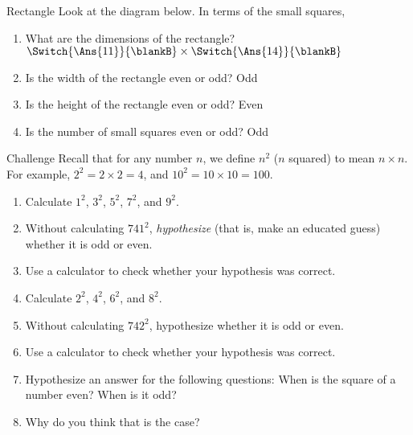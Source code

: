 \documentclass[12pt,letterpaper]{article}
\begin{document}
\begin{problem}{Rectangle}
 Look at the diagram below. In terms of the small squares,

 \begin{center}
 \end{center}

 \begin{enumerate}
  \item What are the dimensions of the rectangle? \hfill
  \(\Switch{\Ans{11}}{\blankB}\times\Switch{\Ans{14}}{\blankB}\)
  \item Is the width of the rectangle even or odd?
  \hfill Odd \hspace{1em} 
  \item Is the height of the rectangle even or odd?
  \hfill {} \hspace{1em} Even
  \item Is the number of small squares even or odd?
  \hfill Odd \hspace{1em} 
 \end{enumerate}
\end{problem}

\begin{problem}{Challenge}
 Recall that for any number $n$, we define $n^2$ ($n$ squared) to mean
 $n\times n$. For example, $2^2=2\times2=4$, and $10^2=10\times10=100$.

 \begin{enumerate}
  \item Calculate $1^2$, $3^2$, $5^2$, $7^2$, and $9^2$.
  \item Without calculating $741^2$, \emph{hypothesize} (that is, make an
  educated guess) whether it is odd or even.
  \item Use a calculator to check whether your hypothesis was correct.
  \item Calculate \(2^2\), $4^2$, $6^2$, and $8^2$.
  \item Without calculating $742^2$, hypothesize whether it is odd or even.
  \item Use a calculator to check whether your hypothesis was correct.
  \item Hypothesize an answer for the following questions:
  When is the square of a number even? When is it odd?
  \item Why do you think that is the case?
 \end{enumerate}
\end{problem}
\end{document}
